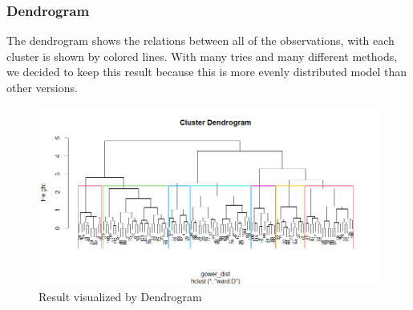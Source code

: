     \subsubsection{Dendrogram}
        The dendrogram shows the relations between all of the observations, with each cluster is shown by colored lines. With many tries and many different methods, we decided to keep this result because this is more evenly distributed model than other versions.
        \begin{figure}[H]
            \centering
            \includegraphics[scale=0.6]{graphics/gower/dendrogram/gower_dist_ward.png}
            \caption{Result visualized by Dendrogram}
        \end{figure}

